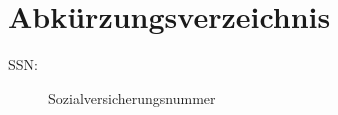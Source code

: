 
\section *{Abkürzungsverzeichnis} %
\begin{description}
\item[SSN:] Sozialversicherungsnummer
\end{description}
